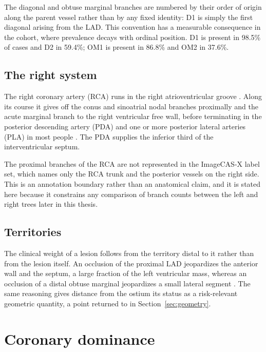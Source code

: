 The diagonal and obtuse marginal branches are numbered by their order of origin along the
parent vessel rather than by any fixed identity: D1 is simply the first diagonal arising from
the LAD.
This convention has a measurable consequence in the cohort, where prevalence decays with
ordinal position.
D1 is present in 98.5\% of cases and D2 in 59.4\%; OM1 is present in 86.8\% and OM2 in
37.6\%.

\subsection{The right system}

The right coronary artery (RCA) runs in the right atrioventricular groove
\cite{devos2024coronary}.
Along its course it gives off the conus and sinoatrial nodal branches proximally and the
acute marginal branch to the right ventricular free wall, before terminating in the posterior
descending artery (PDA) and one or more posterior lateral arteries (PLA) in most people
\cite{devos2024coronary,obrien2007anatomy}.
The PDA supplies the inferior third of the interventricular septum.

The proximal branches of the RCA are not represented in the ImageCAS-X label set, which names
only the RCA trunk and the posterior vessels on the right side.
This is an annotation boundary rather than an anatomical claim, and it is stated here because
it constrains any comparison of branch counts between the left and right trees later in this
thesis.

\subsection{Territories}

The clinical weight of a lesion follows from the territory distal to it rather than from the
lesion itself.
An occlusion of the proximal LAD jeopardizes the anterior wall and the septum, a large
fraction of the left ventricular mass, whereas an occlusion of a distal obtuse marginal
jeopardizes a small lateral segment \cite{devos2024coronary}.
The same reasoning gives distance from the ostium its status as a risk-relevant geometric
quantity, a point returned to in Section~\ref{sec:geometry}.

\section{Coronary dominance}
\label{sec:dominance}

